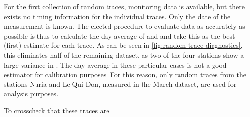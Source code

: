For the first collection of random traces, monitoring data is available, but there exists no timing information for the individual traces. Only the date of the 
measurement is known. The elected procedure to evaluate data as accurately as possible is thus to calculate the day average of \Ipeak and \Qpeak and take this as 
the best (first) estimate for each trace. As can be seen in \autoref{fig:random-trace-diagnostics}, this eliminates half of the remaining dataset, as two of the four 
stations show a large variance in \Ipeak. The day average in these particular cases is not a good estimator for calibration purposes. For this reason, only random 
traces from the stations Nuria and Le Qui Don, measured in the March dataset, are used for analysis purposes.

To crosscheck that these traces are 

